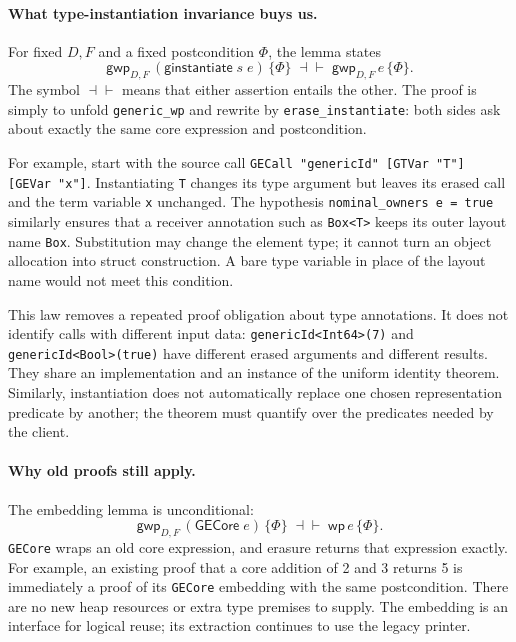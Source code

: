 \documentclass[11pt]{article}
\newcommand{\Wpre}{\mathsf{wp}}
\newcommand{\GWpre}{\mathsf{gwp}}
\begin{document}
\paragraph{What type-instantiation invariance buys us.}
For fixed \(D,F\) and a fixed postcondition \(\Phi\), the lemma
 states
\[
\GWpre_{D,F}\,(\mathsf{ginstantiate}\;s\;e)\,\{\Phi\}
\;\dashv\vdash\;
\GWpre_{D,F}\,e\,\{\Phi\}.
\]
The symbol \(\dashv\vdash\) means that either assertion entails the
other. The proof is simply to unfold \texttt{generic\_wp} and rewrite
by \texttt{erase\_instantiate}: both sides ask about exactly the same
core expression and postcondition.

For example, start with the source call
\texttt{GECall "genericId" [GTVar "T"] [GEVar "x"]}.
Instantiating \texttt{T} changes its type argument but leaves its erased
call and the term variable \texttt{x} unchanged. The hypothesis
\texttt{nominal\_owners e = true} similarly ensures that a receiver
annotation such as \texttt{Box<T>} keeps its outer layout name
\texttt{Box}. Substitution may change the element type; it cannot turn
an object allocation into struct construction. A bare type variable in
place of the layout name would not meet this condition.

This law removes a repeated proof obligation about type annotations.
It does not identify calls with different input data:
\texttt{genericId<Int64>(7)} and \texttt{genericId<Bool>(true)} have
different erased arguments and different results. They share an
implementation and an instance of the uniform identity theorem.
Similarly, instantiation does not automatically replace one chosen
representation predicate by another; the theorem must quantify over the
predicates needed by the client.

\paragraph{Why old proofs still apply.}
The embedding lemma  is unconditional:
\[
\GWpre_{D,F}\,(\mathsf{GECore}\;e)\,\{\Phi\}
\;\dashv\vdash\;
\Wpre\,e\,\{\Phi\}.
\]
\texttt{GECore} wraps an old core expression, and erasure returns that
expression exactly. For example, an existing proof that a core addition
of 2 and 3 returns 5 is immediately a proof of its \texttt{GECore}
embedding with the same postcondition. There are no new heap resources
or extra type premises to supply. The embedding is an interface for
logical reuse; its extraction continues to use the legacy printer.
\end{document}
